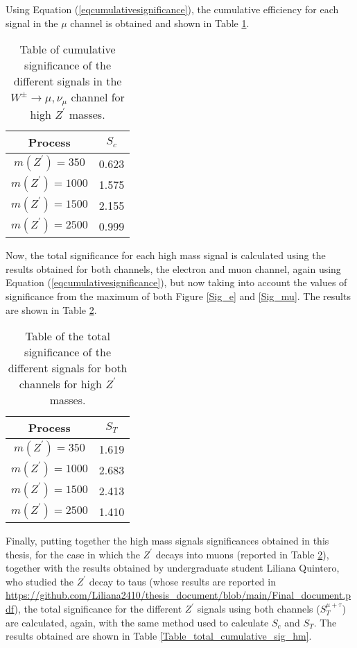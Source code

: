 Using Equation (\ref{eqcumulativesignificance}), the cumulative efficiency for each signal in the $\mu$ channel is obtained and shown in Table \ref{Table_cumulative_sig_hm_mu}.

\begin{table}[ht!]
\centering
\caption{Table of cumulative significance of the different signals in the $W^{\pm} \rightarrow \mu, \nu_{\mu}$ channel for high $Z^{\prime}$ masses.}
\label{Table_cumulative_sig_hm_mu}
\begin{tabular}{c|c}
\hline
\hline
Process & $S_c$ \\
\hline
$m(Z^{\prime}) = 350$ & 0.623 \\
$m(Z^{\prime}) = 1000$ & 1.575 \\
$m(Z^{\prime}) = 1500$ & 2.155 \\
$m(Z^{\prime}) = 2500$ & 0.999 \\
\hline
\hline
\end{tabular}
\end{table}

Now, the total significance for each high mass signal is calculated using the results obtained for both channels, the electron and muon channel, again using Equation (\ref{eqcumulativesignificance}), but now taking into account the values of significance from the maximum of both Figure \ref{Sig_e} and \ref{Sig_mu}. The results are shown in Table \ref{Table_total_sig_hm}.

\begin{table}[ht!]
\centering
\caption{Table of the total significance of the different signals for both channels for high $Z^{\prime}$ masses.}
\label{Table_total_sig_hm}
\begin{tabular}{c|c}
\hline
\hline
Process & $S_T$ \\
\hline
$m(Z^{\prime}) = 350$ & 1.619 \\
$m(Z^{\prime}) = 1000$ & 2.683 \\
$m(Z^{\prime}) = 1500$ & 2.413 \\
$m(Z^{\prime}) = 2500$ & 1.410 \\
\hline
\hline
\end{tabular}
\end{table}

Finally, putting together the high mass signals significances obtained in this thesis, for the case in which the $Z^{\prime}$ decays into muons (reported in Table \ref{Table_total_sig_hm}), together with the results obtained by undergraduate student Liliana Quintero, who studied the $Z^{\prime}$ decay to taus (whose results are reported in \url{https://github.com/Liliana2410/thesis_document/blob/main/Final_document.pdf}), the total significance for the different $Z^{\prime}$ signals using both channels ($S_T^{\mu + \tau}$) are calculated, again, with the same method used to calculate $S_c$ and $S_T$. The results obtained are shown in Table \ref{Table_total_cumulative_sig_hm}.

